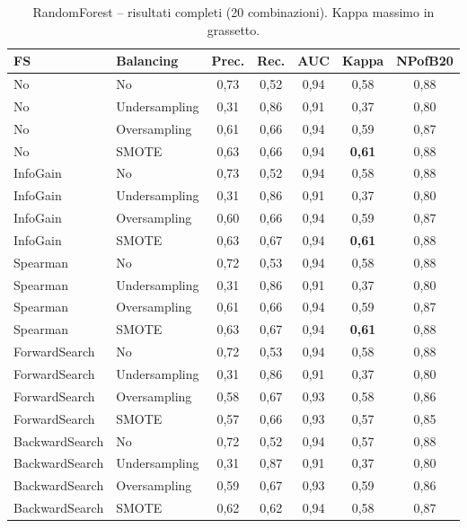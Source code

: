 \begin{table}[h!]
\centering
\small
\begin{tabular}{@{}llccccc@{}}
\toprule
\textbf{FS} & \textbf{Balancing} & \textbf{Prec.} & \textbf{Rec.} &
\textbf{AUC} & \textbf{Kappa} & \textbf{NPofB20} \\
\midrule
No             & No            & 0,73 & 0,52 & 0,94 & 0,58 & 0,88 \\
No             & Undersampling & 0,31 & 0,86 & 0,91 & 0,37 & 0,80 \\
No             & Oversampling  & 0,61 & 0,66 & 0,94 & 0,59 & 0,87 \\
No             & SMOTE         & 0,63 & 0,66 & 0,94 & \textbf{0,61} & 0,88 \\
InfoGain       & No            & 0,73 & 0,52 & 0,94 & 0,58 & 0,88 \\
InfoGain       & Undersampling & 0,31 & 0,86 & 0,91 & 0,37 & 0,80 \\
InfoGain       & Oversampling  & 0,60 & 0,66 & 0,94 & 0,59 & 0,87 \\
InfoGain       & SMOTE         & 0,63 & 0,67 & 0,94 & \textbf{0,61} & 0,88 \\
Spearman       & No            & 0,72 & 0,53 & 0,94 & 0,58 & 0,88 \\
Spearman       & Undersampling & 0,31 & 0,86 & 0,91 & 0,37 & 0,80 \\
Spearman       & Oversampling  & 0,61 & 0,66 & 0,94 & 0,59 & 0,87 \\
Spearman       & SMOTE         & 0,63 & 0,67 & 0,94 & \textbf{0,61} & 0,88 \\
ForwardSearch  & No            & 0,72 & 0,53 & 0,94 & 0,58 & 0,88 \\
ForwardSearch  & Undersampling & 0,31 & 0,86 & 0,91 & 0,37 & 0,80 \\
ForwardSearch  & Oversampling  & 0,58 & 0,67 & 0,93 & 0,58 & 0,86 \\
ForwardSearch  & SMOTE         & 0,57 & 0,66 & 0,93 & 0,57 & 0,85 \\
BackwardSearch & No            & 0,72 & 0,52 & 0,94 & 0,57 & 0,88 \\
BackwardSearch & Undersampling & 0,31 & 0,87 & 0,91 & 0,37 & 0,80 \\
BackwardSearch & Oversampling  & 0,59 & 0,67 & 0,93 & 0,59 & 0,86 \\
BackwardSearch & SMOTE         & 0,62 & 0,62 & 0,94 & 0,58 & 0,87 \\
\bottomrule
\end{tabular}
\caption{RandomForest -- risultati completi (20 combinazioni). Kappa massimo in grassetto.}
\label{tab:r2-rf-full}
\end{table}

